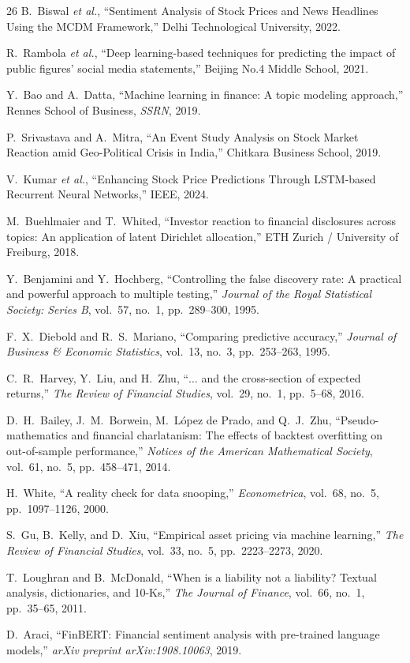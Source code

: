 \documentclass[11pt]{article}
\begin{document}
\begin{thebibliography}{26}
B.~Biswal \textit{et al.}, ``Sentiment Analysis of Stock Prices and News Headlines Using the MCDM Framework,'' Delhi Technological University, 2022.

R.~Rambola \textit{et al.}, ``Deep learning-based techniques for predicting the impact of public figures' social media statements,'' Beijing No.4 Middle School, 2021.

Y.~Bao and A.~Datta, ``Machine learning in finance: A topic modeling approach,'' Rennes School of Business, \textit{SSRN}, 2019.

P.~Srivastava and A.~Mitra, ``An Event Study Analysis on Stock Market Reaction amid Geo-Political Crisis in India,'' Chitkara Business School, 2019.

V.~Kumar \textit{et al.}, ``Enhancing Stock Price Predictions Through LSTM-based Recurrent Neural Networks,'' IEEE, 2024.

M.~Buehlmaier and T.~Whited, ``Investor reaction to financial disclosures across topics: An application of latent Dirichlet allocation,'' ETH Zurich / University of Freiburg, 2018.

Y.~Benjamini and Y.~Hochberg, ``Controlling the false discovery rate: A practical and powerful approach to multiple testing,'' \textit{Journal of the Royal Statistical Society: Series B}, vol.~57, no.~1, pp.~289--300, 1995.

F.~X.~Diebold and R.~S.~Mariano, ``Comparing predictive accuracy,'' \textit{Journal of Business \& Economic Statistics}, vol.~13, no.~3, pp.~253--263, 1995.

C.~R.~Harvey, Y.~Liu, and H.~Zhu, ``$\ldots$ and the cross-section of expected returns,'' \textit{The Review of Financial Studies}, vol.~29, no.~1, pp.~5--68, 2016.

D.~H.~Bailey, J.~M.~Borwein, M.~L\'{o}pez de Prado, and Q.~J.~Zhu, ``Pseudo-mathematics and financial charlatanism: The effects of backtest overfitting on out-of-sample performance,'' \textit{Notices of the American Mathematical Society}, vol.~61, no.~5, pp.~458--471, 2014.

H.~White, ``A reality check for data snooping,'' \textit{Econometrica}, vol.~68, no.~5, pp.~1097--1126, 2000.

S.~Gu, B.~Kelly, and D.~Xiu, ``Empirical asset pricing via machine learning,'' \textit{The Review of Financial Studies}, vol.~33, no.~5, pp.~2223--2273, 2020.

T.~Loughran and B.~McDonald, ``When is a liability not a liability? Textual analysis, dictionaries, and 10-Ks,'' \textit{The Journal of Finance}, vol.~66, no.~1, pp.~35--65, 2011.

D.~Araci, ``FinBERT: Financial sentiment analysis with pre-trained language models,'' \textit{arXiv preprint arXiv:1908.10063}, 2019.

\end{thebibliography}
\end{document}

